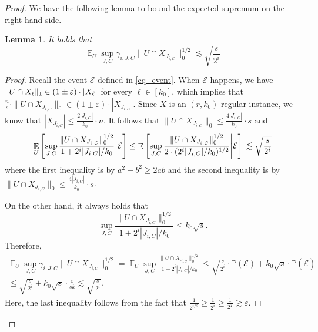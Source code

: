 \documentclass[11pt,letterpaper]{article}
\newtheorem{lemma}[theorem]{Lemma}
\theoremstyle{definition}
\newcommand{\eps}{\varepsilon}
\DeclareMathOperator*{\E}{\ensuremath{\mathbb{E}}}
\DeclarePairedDelimiter{\norm}{\lVert}{\rVert}
\begin{document}
\begin{proof}
We have the following lemma to bound the expected supremum on the right-hand side.
\begin{lemma} \label{lemma_chaining_var1}
It holds that $$
\E_U \sup_{J,C} \gamma_{i,J,C}\|U\cap X_{J_{i,C}}\|_0^{1/2} \lesssim \sqrt{\frac{s}{2^i}}
$$
\end{lemma}
\begin{proof}
Recall the event $\mathcal{E}$ defined in \eqref{eq_event}. When $\mathcal{E}$ happens, we have $\norm{U\cap X_\ell}_1 \in (1\pm \eps)\cdot |X_\ell|$ for every $\ell\in [k_0]$, which implies that $\frac{n}{s}\cdot \|U\cap X_{J_{i,C}}\|_0 \in (1\pm\eps) \cdot |X_{J_{i,C}}|$. Since $X$ is an $(r,k_0)$-regular instance, we know that $|X_{J_{i,C}}|\leq \frac{2|J_{i,C}|}{k_0}\cdot n$. It follows that $\|U\cap X_{J_{i,C}}\|_0\leq \frac{4|J_{i,C}|}{k_0}\cdot s$
and
\[
\E_U \left[\sup_{J,C}\frac{\|U\cap X_{J_{i,C}}\|^{1/2}_0}{ 1+2^i|J_{i,C}|/k_0} \middle| \mathcal{E}\right]
\leq  \E \left[\sup_{J,C}\frac{\|U\cap X_{J_{i,C}}\|^{1/2}_0}{ 2\cdot (2^{i}|J_{i,C}|/k_0)^{1/2}} \middle| \mathcal{E} \right]\\
\lesssim \sqrt{\frac{s}{2^i}}
\]
where the first inequality is by $a^2+b^2\geq 2ab$ and the second inequality is by $\|U\cap X_{J_{i,C}}\|_0\leq \frac{4|J_{i,C}|}{k_0}\cdot s$.

On the other hand, it always holds that
\[
    \sup_{J,C}\frac{\|U\cap X_{J_{i,C}}\|^{1/2}_0}{ 1+2^i|J_{i,C}|/k_0} \leq k_0\sqrt{s}.
\]
Therefore,
\begin{multline*}
\E_U \sup_{J,C} \gamma_{i,J,C}\|U\cap X_{J_{i,C}}\|_0^{1/2} = \E_U \sup_{J,C}\frac{\|U\cap X_{J_{i,C}}\|^{1/2}_0}{ 1+2^i|J_{i,C}|/k_0}
\leq \sqrt{\frac{s}{2^i}}\cdot \mathbb{P}(\mathcal{E}) + k_0\sqrt{s}\cdot \mathbb{P}(\bar{\mathcal{E}})\\
\leq \sqrt{\frac{s}{2^i}} + k_0\sqrt{s}\cdot \frac{\eps}{sk}
\lesssim \sqrt{\frac{s}{2^i}}.
\end{multline*}
Here, the last inequality follows from the fact that $\frac{1}{2^{i/2}}\geq \frac{1}{2^i}\geq \frac{1}{2^T}\gtrsim \eps$.
\end{proof}


\end{proof}
\end{document}

